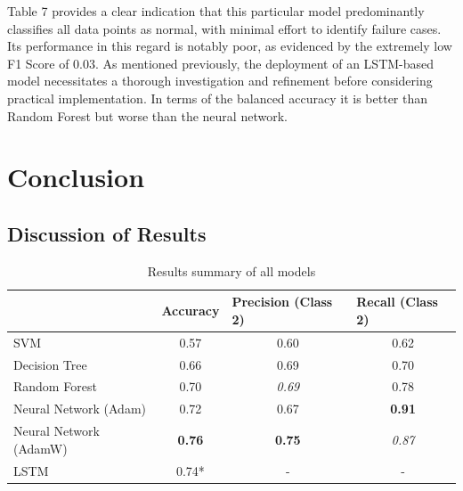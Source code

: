 \documentclass{article}
\begin{document}
Table 7 provides a clear indication that this particular model predominantly classifies all data points as normal, with minimal effort to identify failure cases. Its performance in this regard is notably poor, as evidenced by the extremely low F1 Score of 0.03. As mentioned previously, the deployment of an LSTM-based model necessitates a thorough investigation and refinement before considering practical implementation. In terms of the balanced accuracy it is better than Random Forest but worse than the neural network.

\section{Conclusion}

\subsection{Discussion of Results}

\begin{table}[htbp]
\caption{Results summary of all models}
\centering
\begin{tabular}{l|c|c|c|}
\cline{2-4}
                                             & \multicolumn{1}{l|}{Accuracy} & \multicolumn{1}{l|}{Precision (Class 2)} & \multicolumn{1}{l|}{Recall (Class 2)} \\ \hline
\multicolumn{1}{|l|}{SVM}                    & 0.57                          & 0.60                                     & 0.62                                  \\
\multicolumn{1}{|l|}{Decision Tree}          & 0.66                          & 0.69                                     & 0.70                                  \\
\multicolumn{1}{|l|}{Random Forest}          & 0.70                          & \textit{0.69}                            & 0.78                                  \\
\multicolumn{1}{|l|}{Neural Network (Adam)}  & 0.72                          & 0.67                                     & \textbf{0.91}                         \\
\multicolumn{1}{|l|}{Neural Network (AdamW)} & \textbf{0.76}                 & \textbf{0.75}                            & \textit{0.87}                         \\
\multicolumn{1}{|l|}{LSTM}                   & 0.74*                         & -                                    & -                                 \\ \hline
\end{tabular}
\end{table}
\end{document}
